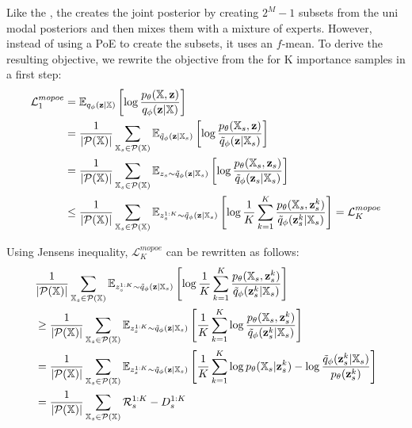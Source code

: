 Like the , the  creates the joint posterior by creating $2^M-1$ subsets from the uni modal posteriors and then mixes them with a mixture of experts.
However, instead of using a PoE to create the subsets, it uses an $f$-mean.
To derive the resulting objective, we rewrite the objective from the  for K importance samples in a first step:
\begin{equation}
    \begin{split}
        \mathcal{L}^{mopoe}_1 &= \mathbb{E}_{q_{\phi}(\textbf{z}|\mathbb{X})} \left[ \log \frac{p_{\theta}(\mathbb{X}, \textbf{z})}{q_{\phi}(\textbf{z}|\mathbb{X})} \right]\\
        &=\frac{1}{|\mathcal{P}(\mathbb{X})|} \sum _{\mathbb{X}_s \in \mathcal{P}(\mathbb{X})} \mathbb{E}_{\tilde{q}_{\phi}(\textbf{z}|\mathbb{X}_s)} \left[ \log \frac{p_{\theta}(\mathbb{X}_s, \textbf{z})}{\tilde{q}_{\phi}(\textbf{z}|\mathbb{X}_s)} \right]\\
        &=\frac{1}{|\mathcal{P}(\mathbb{X})|} \sum _{\mathbb{X}_s \in \mathcal{P}(\mathbb{X})} \mathbb{E}_{z_s \sim \tilde{q}_{\phi}(\textbf{z}|\mathbb{X}_s)} \left[ \log \frac{p_{\theta}(\mathbb{X}_s, \textbf{z}_s)}{\tilde{q}_{\phi}(\textbf{z}_s|\mathbb{X}_s)} \right]\\
        &\leq \frac{1}{|\mathcal{P}(\mathbb{X})|} \sum _{\mathbb{X}_s \in \mathcal{P}(\mathbb{X})} \mathbb{E}_{z^{1:K}_s \sim \tilde{q}_{\phi}(\textbf{z}|\mathbb{X}_s)} \left[ \log \frac{1}{K} \sum _{k=1}^K \frac{p_{\theta}(\mathbb{X}_s, \textbf{z}^k _s)}{\tilde{q}_{\phi}(\textbf{z}^k _s|\mathbb{X}_s)} \right] = \mathcal{L}^{mopoe}_K
    \end{split}
\end{equation}

Using Jensens inequality, $\mathcal{L}^{mopoe}_K$ can be rewritten as follows:
\begin{equation}
    \begin{split}
        &\frac{1}{|\powerset|} \sum _{\xsubset \in \powerset} \mathbb{E}_{z^{1:K}_s \sim \subsetpost} \left[ \log \frac{1}{K} \sum _{k=1}^K \frac{p_{\theta}(\xsubset, \textbf{z}^k _s)}{\tilde{q}_{\phi}(\textbf{z}^k _s|\xsubset)} \right]\\
%
        &\geq \frac{1}{|\powerset|} \sum _{\xsubset \in \powerset} \mathbb{E}_{z^{1:K}_s \sim \subsetpost} \left[ \frac{1}{K} \sum _{k=1}^K \log  \frac{p_{\theta}(\xsubset, \textbf{z}^k _s)}{\tilde{q}_{\phi}(\textbf{z}^k _s|\xsubset)} \right]\\
%
        &= \frac{1}{|\powerset|} \sum _{\xsubset \in \powerset} \mathbb{E}_{z^{1:K}_s \sim \subsetpost} \left[ \frac{1}{K} \sum _{k=1}^K \log p_\theta (\xsubset|\textbf{z}^k _s) -\log  \frac{\tilde{q}_{\phi}(\textbf{z}^k _s|\xsubset)}{p_{\theta}(\textbf{z}^k _s)} \right]\\
%
        &= \frac{1}{|\powerset|} \sum _{\xsubset \in \powerset} \mathcal{R}^{1:K}_s - D^{1:K}_s
    \end{split}
\end{equation}


